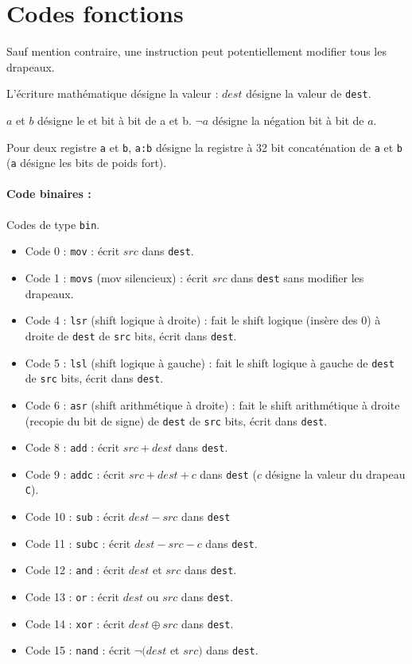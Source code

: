 \documentclass[12pt]{article}
\begin{document}
\section{Codes fonctions}

Sauf mention contraire, une instruction peut potentiellement modifier tous les
drapeaux.

L'écriture mathématique désigne la valeur : $dest$ désigne la valeur de \verb!dest!.

$a$ et $b$ désigne le \og et \fg{} bit à bit de a et b. $\neg a$ désigne la
négation bit à bit de $a$.

Pour deux registre \verb!a! et \verb!b!, \verb!a:b! désigne la registre à 32 bit
concaténation de \verb!a! et \verb!b! (\verb!a! désigne les bits de poids fort).


\paragraph{Code binaires :} Codes de type \verb!bin!.
\begin{itemize}
\item Code 0 : \verb!mov! : écrit $src$ dans \verb!dest!.
\item Code 1 : \verb!movs! (mov silencieux) : écrit $src$ dans \verb!dest!
  sans modifier les drapeaux.
\item Code 4 : \verb!lsr! (shift logique à droite) : fait le shift logique
  (insère des 0) à droite de \verb!dest! de \verb!src! bits, écrit dans \verb!dest!.
\item Code 5 : \verb!lsl! (shift logique à gauche) : fait le shift logique à
  gauche de \verb!dest! de \verb!src! bits, écrit dans \verb!dest!.
\item Code 6 : \verb!asr! (shift arithmétique à droite) : fait le shift arithmétique à
  droite (recopie du bit de signe) de \verb!dest! de \verb!src! bits, écrit dans \verb!dest!.
\item Code 8 : \verb!add! : écrit $src + dest$ dans \verb!dest!.
\item Code 9 : \verb!addc! : écrit $src + dest + c$ dans \verb!dest! ($c$
  désigne la valeur du drapeau \verb!C!).
\item Code 10 : \verb!sub! : écrit $dest - src$ dans \verb!dest!
\item Code 11 : \verb!subc! : écrit $dest - src -c $ dans \verb!dest!.
\item Code 12 : \verb!and! : écrit $dest$ et $src$ dans \verb!dest!.
\item Code 13 : \verb!or! : écrit $dest$ ou $src$ dans \verb!dest!.
\item Code 14 : \verb!xor! : écrit $dest \oplus src$ dans \verb!dest!.
\item Code 15 : \verb!nand! : écrit $\neg(dest$ et $src)$ dans \verb!dest!.

\end{itemize}
\end{document}

